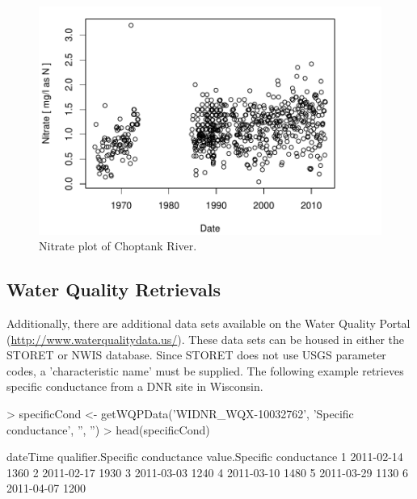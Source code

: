 \documentclass[a4paper,11pt]{article}
\begin{document}
\begin{figure}
\begin{center}
\includegraphics{dataRetrieval-fig3}
\end{center}
\caption{Nitrate plot of Choptank River.}
\end{figure}

\subsection{Water Quality Retrievals}
Additionally, there are additional data sets available on the Water Quality Portal (\url{http://www.waterqualitydata.us/}).  These data sets can be housed in either the STORET or NWIS database.  Since STORET does not use USGS parameter codes, a 'characteristic name' must be supplied.  The following example retrieves specific conductance from a DNR site in Wisconsin.

\begin{Schunk}
\begin{Sinput}
> specificCond <- getWQPData('WIDNR_WQX-10032762', 
         'Specific conductance', '', '')
> head(specificCond)
\end{Sinput}
\begin{Soutput}
    dateTime qualifier.Specific conductance value.Specific conductance
1 2011-02-14                                                      1360
2 2011-02-17                                                      1930
3 2011-03-03                                                      1240
4 2011-03-10                                                      1480
5 2011-03-29                                                      1130
6 2011-04-07                                                      1200
\end{Soutput}
\end{Schunk}
\end{document}
